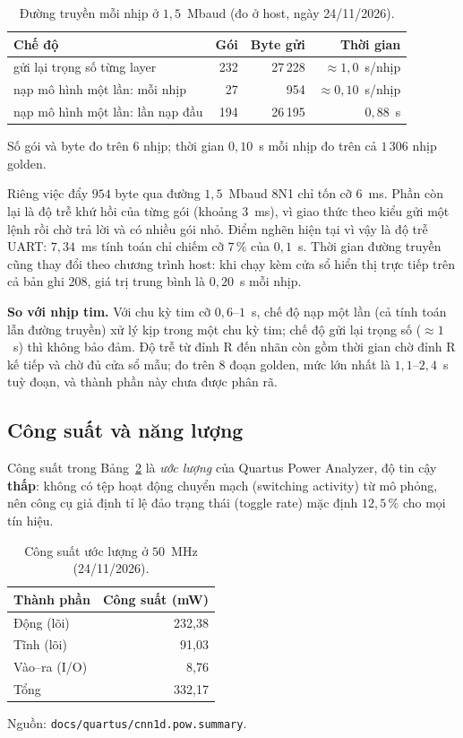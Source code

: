 \begin{table}[htbp]\centering
\caption{Đường truyền mỗi nhịp ở $1{,}5$~Mbaud (đo ở host, ngày 24/11/2026).}\label{tab:uartnhip}
\small\setlength{\tabcolsep}{4pt}
\begin{tabular}{@{}lrrr@{}}
\toprule
Chế độ & Gói & Byte gửi & Thời gian \\ \midrule
gửi lại trọng số từng layer & 232 & 27\,228 & $\approx1{,}0$~s/nhịp \\
nạp mô hình một lần: mỗi nhịp & 27 & 954 & $\approx0{,}10$~s/nhịp \\
nạp mô hình một lần: lần nạp đầu & 194 & 26\,195 & $0{,}88$~s \\ \bottomrule
\end{tabular}

\smallskip
\footnotesize Số gói và byte đo trên $6$ nhịp; thời gian $0{,}10$~s mỗi nhịp đo trên cả $1\,306$ nhịp golden.
\end{table}

Riêng việc đẩy $954$ byte qua đường $1{,}5$~Mbaud 8N1 chỉ tốn cỡ $6$~ms.
Phần còn lại là độ trễ khứ hồi của từng gói (khoảng $3$~ms), vì giao thức theo kiểu gửi một lệnh rồi chờ trả lời và có nhiều gói nhỏ.
Điểm nghẽn hiện tại vì vậy là độ trễ UART: $7{,}34$~ms tính toán chỉ chiếm cỡ $7\,\%$ của $0{,}1$~s.
Thời gian đường truyền cũng thay đổi theo chương trình host: khi chạy kèm cửa sổ hiển thị trực tiếp trên cả bản ghi 208, giá trị trung bình là $0{,}20$~s mỗi nhịp.

\textbf{So với nhịp tim.}
Với chu kỳ tim cỡ $0{,}6$--$1$~s, chế độ nạp một lần (cả tính toán lẫn đường truyền) xử lý kịp trong một chu kỳ tim; chế độ gửi lại trọng số ($\approx1$~s) thì không bảo đảm.
Độ trễ từ đỉnh R đến nhãn còn gồm thời gian chờ đỉnh R kế tiếp và chờ đủ cửa sổ mẫu; đo trên $8$ đoạn golden, mức lớn nhất là $1{,}1$--$2{,}4$~s tuỳ đoạn, và thành phần này chưa được phân rã.

\subsection{Công suất và năng lượng}
Công suất trong Bảng~\ref{tab:congsuat} là \emph{ước lượng} của Quartus Power Analyzer, độ tin cậy \textbf{thấp}: không có tệp hoạt động chuyển mạch (switching activity) từ mô phỏng, nên công cụ giả định tỉ lệ đảo trạng thái (toggle rate) mặc định $12{,}5\,\%$ cho mọi tín hiệu.

\begin{table}[htbp]\centering
\caption{Công suất ước lượng ở $50$~MHz (24/11/2026).}\label{tab:congsuat}
\small
\begin{tabular}{@{}lr@{}}
\toprule
Thành phần & Công suất (mW) \\ \midrule
Động (lõi) & 232{,}38 \\
Tĩnh (lõi) & 91{,}03 \\
Vào--ra (I/O) & 8{,}76 \\ \midrule
Tổng & 332{,}17 \\ \bottomrule
\end{tabular}

\smallskip
\footnotesize Nguồn: \texttt{docs/quartus/cnn1d.pow.summary}.
\end{table}

